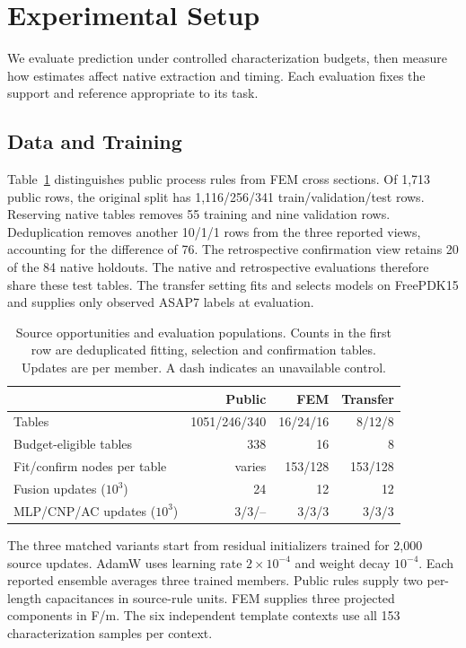 \section{Experimental Setup}
We evaluate prediction under controlled characterization budgets, then measure how estimates affect native extraction and timing. Each evaluation fixes the support and reference appropriate to its task.

\subsection{Data and Training}
Table~\ref{tab:data} distinguishes public process rules from FEM cross sections. Of 1,713 public rows, the original split has 1,116/256/341 train/validation/test rows. Reserving native tables removes 55 training and nine validation rows. Deduplication removes another 10/1/1 rows from the three reported views, accounting for the difference of 76. The retrospective confirmation view retains 20 of the 84 native holdouts. The native and retrospective evaluations therefore share these test tables. The transfer setting fits and selects models on FreePDK15 and supplies only observed ASAP7 labels at evaluation.
\begin{table}[t]\centering
\caption{Source opportunities and evaluation populations. Counts in the first row are deduplicated fitting, selection and confirmation tables. Updates are per member. A dash indicates an unavailable control.}\label{tab:data}
\small\begin{tabular}{@{}lrrr@{}}\toprule
 & Public & FEM & Transfer\\\midrule
Tables & 1051/246/340 & 16/24/16 & 8/12/8\\
Budget-eligible tables & 338 & 16 & 8\\
Fit/confirm nodes per table & varies & 153/128 & 153/128\\
Fusion updates ($10^3$) & 24 & 12 & 12\\
MLP/CNP/AC updates ($10^3$) & 3/3/-- & 3/3/3 & 3/3/3\\\bottomrule
\end{tabular}
\end{table}
The three matched variants start from residual initializers trained for 2,000 source updates. AdamW uses learning rate $2\times10^{-4}$ and weight decay $10^{-4}$. Each reported ensemble averages three trained members. Public rules supply two per-length capacitances in source-rule units. FEM supplies three projected components in F/m. The six independent template contexts use all 153 characterization samples per context.

